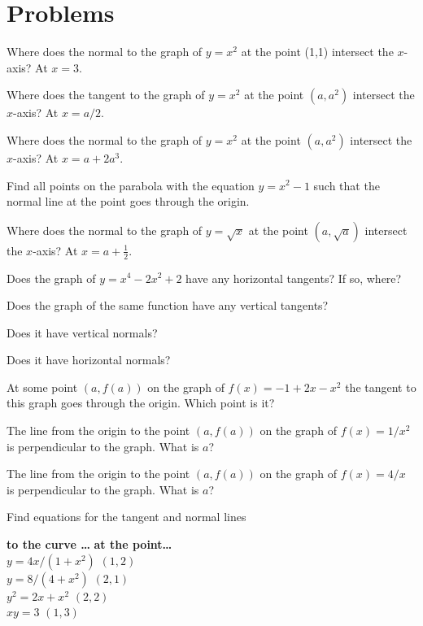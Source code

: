 \section{Problems}
\problemfont
\begin{multicols}{2}\setlength{\parindent}{0pt}
\problem Where does the normal to the graph of $y=x^2$ at the point (1,1)
intersect the $x$-axis?
\answer
At $x=3$.
\endanswer

\problem Where does the tangent to the graph of $y=x^2$ at the point $(a, a^2)$
intersect the $x$-axis?
\answer
At $x=a/2$.  
\endanswer

\problem Where does the normal to the graph of $y=x^2$ at the point $(a, a^2)$
intersect the $x$-axis?
\answer
At $x=a+2a^3$.  
\endanswer

\problem Find all points on the parabola with the equation $y = x^2
-1$ such that the normal line at the point goes through the origin.

\problem Where does the normal to the graph of $y=\sqrt x$ at the point $(a,
\sqrt{a})$
intersect the $x$-axis?
\answer
At $x=a+\frac12$.  
\endanswer


\problem Does the graph of $y=x^4-2x^2+2$ have any horizontal tangents?  If
so, where? 

Does the graph of the same function have any vertical tangents?

Does it have vertical normals?

Does it have horizontal normals?


\problem At some point $(a, f(a))$ on the graph of $f(x) = -1+2x-x^2$
the tangent to this graph goes through the origin.  Which
point is it?

\problem The line from the origin to the point $(a, f(a))$ on the graph of $f(x)
= 1/x^2$ is perpendicular to the graph.  What is $a$?

\problem The line from the origin to the point $(a, f(a))$ on the graph of $f(x)
= 4/x$ is perpendicular to the graph.  What is $a$?

\problem Find equations for the tangent and normal lines

\textbf{to the curve \ldots} \hfill \textbf{at the point\ldots}\\
\subprob $y=4x/(1+x^2) $ \hfill $(1, 2)$\\
\subprob $y=8/(4+x^2) $ \hfill $(2, 1)$\\
\subprob $y^2=2x+x^2$ \hfill $(2, 2)$\\
\subprob $xy=3$ \hfill $(1, 3)$\\




\end{multicols}
